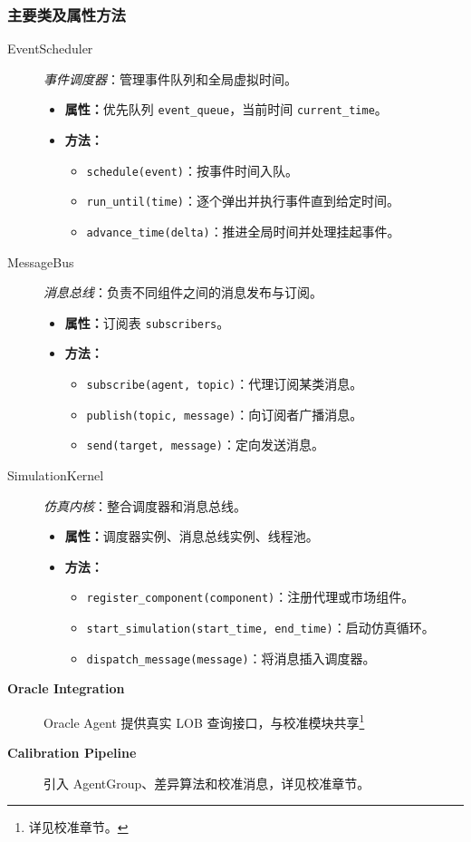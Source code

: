 \subsubsection{主要类及属性方法}
\begin{description}
  \item[EventScheduler] \emph{事件调度器}：管理事件队列和全局虚拟时间。
  \begin{itemize}
    \item \textbf{属性：}优先队列 \verb|event_queue|，当前时间 \verb|current_time|。
    \item \textbf{方法：}
      \begin{itemize}
        \item \verb|schedule(event)|：按事件时间入队。
        \item \verb|run_until(time)|：逐个弹出并执行事件直到给定时间。
        \item \verb|advance_time(delta)|：推进全局时间并处理挂起事件。
      \end{itemize}
  \end{itemize}
  \item[MessageBus] \emph{消息总线}：负责不同组件之间的消息发布与订阅。
  \begin{itemize}
    \item \textbf{属性：}订阅表 \verb|subscribers|。
    \item \textbf{方法：}
      \begin{itemize}
        \item \verb|subscribe(agent, topic)|：代理订阅某类消息。
        \item \verb|publish(topic, message)|：向订阅者广播消息。
        \item \verb|send(target, message)|：定向发送消息。
      \end{itemize}
  \end{itemize}
  \item[SimulationKernel] \emph{仿真内核}：整合调度器和消息总线。
  \begin{itemize}
    \item \textbf{属性：}调度器实例、消息总线实例、线程池。
    \item \textbf{方法：}
      \begin{itemize}
        \item \verb|register_component(component)|：注册代理或市场组件。
        \item \verb|start_simulation(start_time, end_time)|：启动仿真循环。
        \item \verb|dispatch_message(message)|：将消息插入调度器。
      \end{itemize}
  \end{itemize}
  \item[\textbf{Oracle Integration}] Oracle Agent 提供真实 LOB 查询接口，与校准模块共享\footnote{详见校准章节。}
  \item[\textbf{Calibration Pipeline}] 引入 AgentGroup、差异算法和校准消息，详见校准章节。
\end{description}


